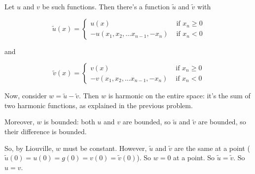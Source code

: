\documentclass[a4paper,12pt]{article}
\begin{document}
Let $u$ and $v$ be such functions. Then there's a function $\tilde{u}$ and $\tilde{v}$ with

\begin{displaymath}
\tilde{u}(x) =
   \left\{
     \begin{array}{lr}
       u(x) & \text{ if } x_n \geq 0\\
       -u(x_1,x_2, \ldots x_{n-1}, -x_n) & \text{ if } x_n < 0
     \end{array}
   \right.
\end{displaymath}

and

\begin{displaymath}
\tilde{v}(x) =
   \left\{
     \begin{array}{lr}
       v(x) & \text{ if } x_n \geq 0\\
       -v(x_1,x_2, \ldots x_{n-1}, -x_n) & \text{ if } x_n < 0
     \end{array}
   \right.
\end{displaymath}

Now, consider $w = \tilde{u} - \tilde{v}$. Then $w$ is harmonic on the entire space: it's the sum of two harmonic functions, as explained in the previous problem.

Moreover, $w$ is bounded: both $u$ and $v$ are bounded, so $\tilde{u}$ and $\tilde{v}$ are bounded, so their difference is bounded.

So, by Liouville, $w$ must be constant. However, $\tilde{u}$ and $\tilde{v}$ are the same at a point ($\tilde{u}(0) = u(0) = g(0) = v(0) = \tilde{v}(0)$). So $w = 0$ at a point. So $\tilde{u} = \tilde{v}$. So $u = v$.

\shunt
\end{document}
